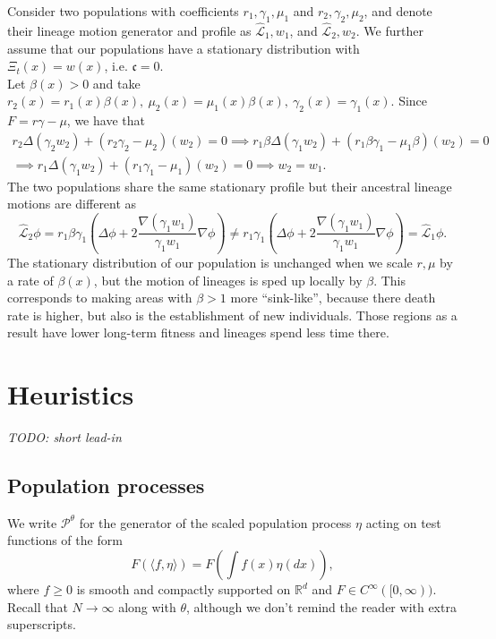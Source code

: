 \documentclass[12pt]{article}
\def \hat{\widehat}
\newcommand{\IR}{\mathbb R}
\newcommand{\Pgen}{\mathcal{P}}    %
\newcommand{\comment}[1]{{\color{blue} \it #1}}
\begin{document}
Consider two populations with coefficients $r_1, \gamma_1, \mu_1$ and  $r_2, \gamma_2, \mu_2$, and denote their lineage motion generator and profile as $\hat{\mathcal{L}}_1,w_1$, and $\hat{\mathcal{L}}_2,w_2$. We further assume that our populations have a stationary distribution with $\Xi_t(x)=w(x)$, i.e. $\mathfrak{c}=0$.\\
Let $\beta(x)>0$ and take $r_2(x)=r_1(x)\beta(x),~ \mu_2(x)=\mu_1(x)\beta(x),~ \gamma_2(x)=\gamma_1(x)$. Since $F=r\gamma-\mu$, we have that 
\begin{multline}
\label{eq: same profile scaled}
r_2\Delta(\gamma_2 w_2)+(r_2\gamma_2-\mu_2)(w_2)=0\implies r_1\beta \Delta(\gamma_1 w_2)+(r_1\beta \gamma_1-\mu_1 \beta)(w_2)=0\\
\implies r_1 \Delta(\gamma_1 w_2)+(r_1 \gamma_1-\mu_1)(w_2)=0 \implies w_2=w_1.
\end{multline}
The two populations share the same stationary profile but their ancestral lineage motions are different as 
\begin{equation}
\label{eq: different generator scaled}
\hat{\mathcal{L}}_2 \phi = r_1 \beta \gamma_1\left(\Delta\phi+2\frac{\nabla(\gamma_1 w_1)}{\gamma_1 w_1}\nabla\phi\right)\neq r_1 \gamma_1\left(\Delta\phi+2\frac{\nabla(\gamma_1 w_1)}{\gamma_1 w_1}\nabla\phi\right) = \hat{\mathcal{L}}_1 \phi.
\end{equation}
The stationary distribution of our population is unchanged when we scale $r,\mu$ by a rate of $\beta(x)$,
but the motion of lineages is sped up locally by $\beta$.
This corresponds to making areas with $\beta > 1$ more ``sink-like'',
because there death rate is higher, but also is the establishment of new individuals. Those regions as a result have lower long-term fitness and lineages spend less time there.


\section{Heuristics}
    \label{sec:heuristics}

\comment{TODO: short lead-in}

\subsection{Population processes}
    \label{sec:population_heuristics}

We write $\Pgen^\theta$
for the generator of the scaled population process $\eta$ acting
on test functions of the form 
$$
    F( \langle f, \eta\rangle )
    =
    F \left( \int f(x)\eta(dx) \right),
$$
where $f \geq 0$ is smooth and compactly supported on $\IR^d$ and 
$F \in C^\infty ([0,\infty))$.
Recall that $N \to \infty$ along with $\theta$,
although we don't remind the reader with extra superscripts.
\end{document}
